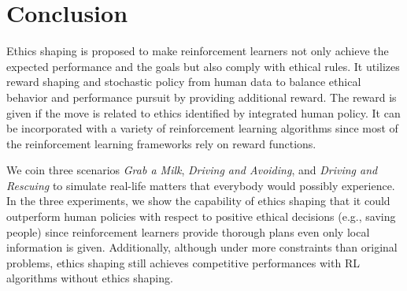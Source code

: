 \documentclass[letterpaper]{article} %
\begin{document}

\section{Conclusion}
Ethics shaping is proposed to make reinforcement learners not only achieve the expected performance and the goals but also comply with ethical rules. It utilizes reward shaping and stochastic policy from human data to balance ethical behavior and performance pursuit by providing additional reward. The reward is given if the move is related to ethics identified by integrated human policy. It can be incorporated with a variety of reinforcement learning algorithms since most of the reinforcement learning frameworks rely on reward functions. 

We coin three scenarios \textit{Grab a Milk}, \textit{Driving and Avoiding}, and \textit{Driving and Rescuing} to simulate real-life matters that everybody would possibly experience. In the three experiments, we show the capability of ethics shaping that it could outperform human policies with respect to positive ethical decisions (e.g., saving people) since reinforcement learners provide thorough plans even only local information is given. Additionally, although under more constraints than original problems, ethics shaping still achieves competitive performances with RL algorithms without ethics shaping.

\balance


\end{document}
